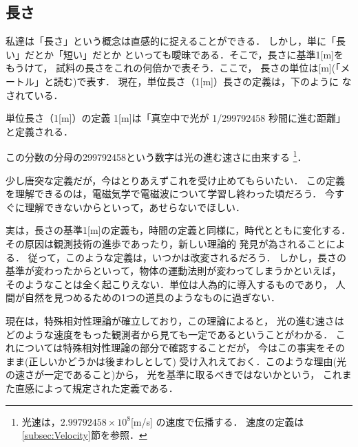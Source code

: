         \subsection{長さ}
            私達は「長さ」という概念は直感的に捉えることができる．
            しかし，単に「長い」だとか「短い」だとか
            といっても曖昧である．そこで，長さに基準1[m]をもうけて，
            試料の長さをこれの何倍かで表そう．ここで，
            長さの単位は[m](「メートル」と読む)で表す．
            現在，単位長さ（1[m]）長さの定義は，下のように
            なされている．
            \begin{myshadebox}{単位長さ（1[m]）の定義}
              1[m]は「真空中で光が 1/299792458 秒間に進む距離」と定義される．
            \end{myshadebox}

            この分数の分母の299792458という数字は光の進む速さに由来する
                \footnote{
                    光速は，$2.99792458\times10^{8}$[m/s] の速度で伝播する．
                    速度の定義は\ref{subsec:Velocity}節を参照．
                }．

            少し唐突な定義だが，今はとりあえずこれを受け止めてもらいたい．
            この定義を理解できるのは，電磁気学で電磁波について学習し終わった頃だろう．
            今すぐに理解できないからといって，あせらないでほしい．

            実は，長さの基準1[m]の定義も，時間の定義と同様に，時代とともに変化する．
            その原因は観測技術の進歩であったり，新しい理論的
            発見が為されることによる．
            従って，このような定義は，いつかは改変されるだろう．
            しかし，長さの基準が変わったからといって，物体の運動法則が変わってしまうかといえば，
            そのようなことは全く起こりえない．単位は人為的に導入するものであり，
            人間が自然を見つめるための1つの道具のようなものに過ぎない．


            現在は，特殊相対性理論が確立しており，この理論によると，
            光の進む速さはどのような速度をもった観測者から見ても一定であるということがわかる．
            これについては特殊相対性理論の部分で確認することだが，
            今はこの事実をそのまま(正しいかどうかは後まわしとして)
            受け入れえておく．このような理由(光の速さが一定であること)から，
            光を基準に取るべきではないかという，
            これまた直感によって規定された定義である．


